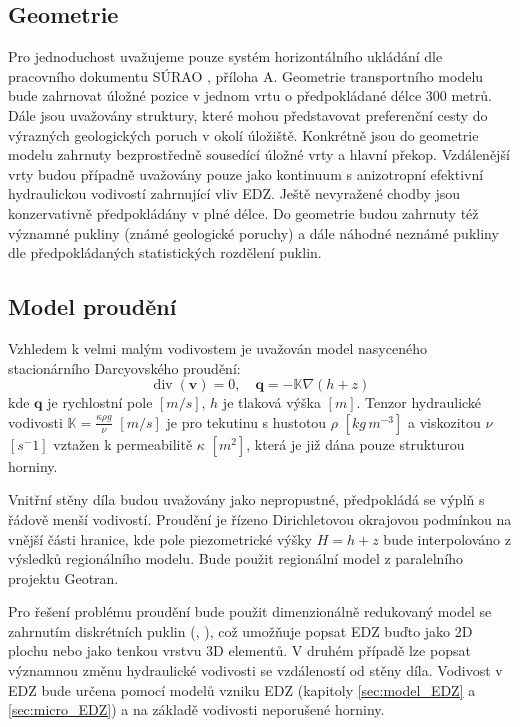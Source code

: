 \documentclass{article}
\def\grad{\nabla}
\def\div{\operatorname{div}}
\def\vc#1{\mathbf{\boldsymbol{#1}}}     %
\def\tn#1{{\mathbb{#1}}}    %
\begin{document}

\subsection{Geometrie}
\label{sec:transport_geometrie}
 Pro jednoduchost uvažujeme pouze systém horizontálního ukládání dle pracovního dokumentu SÚRAO , příloha A. 
 Geometrie transportního modelu bude zahrnovat úložné pozice v jednom vrtu o předpokládané délce 300 metrů. 
 Dále jsou uvažovány  struktury, které mohou představovat preferenční cesty do výrazných geologických poruch v okolí úložiště. 
 Konkrétně jsou do geometrie modelu zahrnuty bezprostředně sousedící úložné vrty a hlavní překop. Vzdálenější vrty budou případně 
 uvažovány pouze jako kontinuum s anizotropní efektivní hydraulickou vodivostí zahrnující vliv EDZ. 
Ještě nevyražené chodby jsou konzervativně předpokládány v plné délce. Do geometrie budou zahrnuty též významné pukliny 
(známé geologické poruchy) a dále náhodné neznámé pukliny dle předpokládaných statistických rozdělení puklin.


\subsection{Model proudění}
\label{sec:transport_flow}
Vzhledem k velmi malým vodivostem je uvažován model nasyceného stacionárního Darcyovského proudění:
\[
    \div(\vc v) = 0, \quad \vc q = -\tn K \grad (h + z)
\]
kde $\vc q$ je rychlostní pole $[m/s]$, $h$ je tlaková výška $[m]$. Tenzor hydraulické vodivosti $\tn K =\frac{\kappa \rho g}{\nu}$
 $[m/s]$ je pro tekutinu s hustotou $\rho$ $[kg\, m^{-3}]$ a viskozitou $\nu$ $[s^-1]$ vztažen k permeabilitě $\kappa$ $[m^2]$, která je již dána pouze strukturou horniny.

Vnitřní stěny díla budou uvažovány jako nepropustné, předpokládá se výplň s řádově menší vodivostí. 
Proudění je řízeno Dirichletovou okrajovou podmínkou na vnější části hranice, kde pole piezometrické výšky $H = h + z$ 
bude interpolováno z výsledků regionálního modelu. Bude použit regionální model z paralelního projektu Geotran.

Pro řešení problému proudění bude použit dimenzionálně redukovaný model se zahrnutím diskrétních puklin (\cite{brezina_analysis_2015}, \cite{flow123d}),
což umožňuje popsat EDZ buďto jako 2D plochu nebo jako tenkou vrstvu 3D elementů.
V druhém případě lze popsat významnou změnu hydraulické vodivosti se vzdáleností od stěny díla.
Vodivost v EDZ bude určena pomocí modelů vzniku EDZ (kapitoly \ref{sec:model_EDZ} a \ref{sec:micro_EDZ}) 
a na základě vodivosti neporušené horniny.
\end{document}
